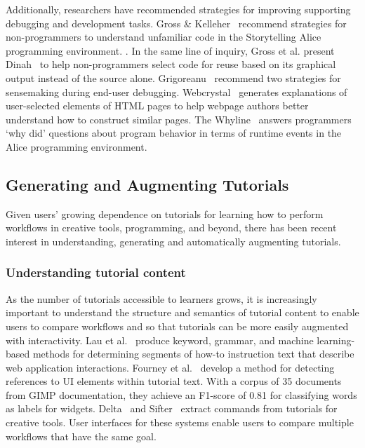 Additionally, researchers have recommended strategies for improving supporting debugging and development tasks.
Gross \& Kelleher~\cite{gross_non-programmers_2010} recommend strategies for non-programmers to understand unfamiliar code in the Storytelling Alice programming environment.
.
In the same line of inquiry, Gross et al. present Dinah~\cite{gross_dinah_2011} to help non-programmers select code for reuse based on its graphical output instead of the source alone.
Grigoreanu~\cite{grigoreanu_end-user_2012} recommend two strategies for sensemaking during end-user debugging.
Webcrystal~\cite{chang_webcrystal_2012} generates explanations of user-selected elements of HTML pages to help webpage authors better understand how to construct similar pages.
The Whyline~\cite{ko_designing_2004} answers programmers `why did' questions about program behavior in terms of runtime events in the Alice programming environment.

\subsection{Generating and Augmenting Tutorials}

Given users' growing dependence on tutorials for learning how to perform workflows in creative tools, programming, and beyond, there has been recent interest in understanding, generating and automatically augmenting tutorials.

\subsubsection{Understanding tutorial content}

As the number of tutorials accessible to learners grows, it is increasingly important to understand the structure and semantics of tutorial content to enable users to compare workflows and so that tutorials can be more easily augmented with interactivity.
Lau et al.~\cite{lau_interpreting_2009} produce keyword, grammar, and machine learning-based methods for determining segments of how-to instruction text that describe web application interactions.
Fourney et al.~\cite{fourney_then_2012} develop a method for detecting references to UI elements within tutorial text.
With a corpus of 35 documents from GIMP documentation, they achieve an F1-score of 0.81 for classifying words as labels for widgets.
Delta~\cite{kong_delta_2012} and Sifter~\cite{pavel_browsing_2013} extract commands from tutorials for creative tools.
User interfaces for these systems enable users to compare multiple workflows that have the same goal.

